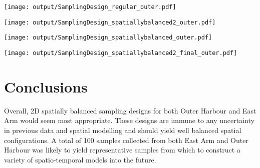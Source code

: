 \documentclass[a4paper]{article}
\let\origfigure=\figure
\let\endorigfigure=\endfigure
\renewenvironment{figure}[1][]{%
   \origfigure[H]
}{%
   \endorigfigure
}
\begin{document}
\begin{figure}
\centering\scriptsize
\texttt{[image: output/SamplingDesign\_regular\_outer.pdf]}
\caption{Sampling configurations associated with the lowest mean Error
for each sample size for Regular grid sampling for the Outer
Harbour\label{fig:SamplingDesign_regular_outer}}
\end{figure}

\begin{figure}
\centering\scriptsize
\texttt{[image: output/SamplingDesign\_spatiallybalanced2\_outer.pdf]}
\caption{Sampling configurations associated with the lowest mean Error
for each sample size for nD Spatially balanced sampling for the Outer
Harbour\label{fig:SamplingDesign_spatiallybalanced2_outer}}
\end{figure}

\begin{figure}
\centering\scriptsize
\texttt{[image: output/SamplingDesign\_spatiallybalanced\_outer.pdf]}
\caption{Sampling configurations associated with the lowest mean Error
for each sample size for 2D Spatially balanced sampling for the Outer
Harbour\label{fig:SamplingDesign_spatiallybalanced_outer}}
\end{figure}

\begin{figure}
\centering\scriptsize
\texttt{[image: output/SamplingDesign\_spatiallybalanced2\_final\_outer.pdf]}
\caption{Two dimensional spatially balanced sampling configuration for
the Outer Harbour (100
samples)\label{fig:SamplingDesign_spatiallybalanced2_final_outer}}
\end{figure}

\hypertarget{conclusions}{%
\section{Conclusions}\label{conclusions}}

Overall, 2D spatially balanced sampling designs for both Outer Harbour
and East Arm would seem most appropriate. These designs are immune to
any uncertainty in previous data and spatial modelling and should yield
well balanced spatial configurations. A total of 100 samples collected
from both East Arm and Outer Harbour was likely to yield representative
samples from which to construct a variety of spatio-temporal models into
the future.
\end{document}
